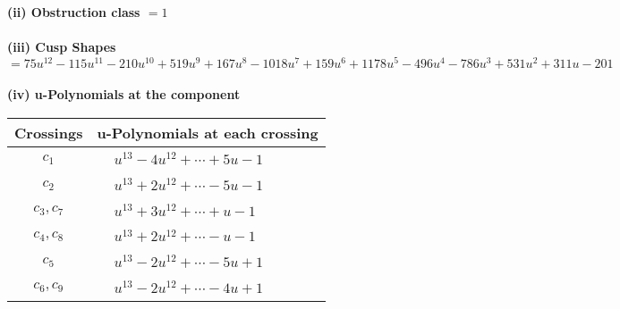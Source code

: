 \documentclass[1p]{elsarticle_modified}
\theoremstyle{definition}
\begin{document}
\flushleft \textbf{(ii) Obstruction class $= 1$}\\~\\
\flushleft \textbf{(iii) Cusp Shapes $= 75 u^{12}-115 u^{11}-210 u^{10}+519 u^9+167 u^8-1018 u^7+159 u^6+1178 u^5-496 u^4-786 u^3+531 u^2+311 u-201$}\\~\\
\newpage\renewcommand{\arraystretch}{1}
\flushleft \textbf{(iv) u-Polynomials at the component}\newline \\
\begin{tabular}{m{50pt}|m{274pt}}
Crossings & \hspace{64pt}u-Polynomials at each crossing \\
\hline $$\begin{aligned}c_{1}\end{aligned}$$&$\begin{aligned}
&u^{13}-4 u^{12}+\cdots+5 u-1
\end{aligned}$\\
\hline $$\begin{aligned}c_{2}\end{aligned}$$&$\begin{aligned}
&u^{13}+2 u^{12}+\cdots-5 u-1
\end{aligned}$\\
\hline $$\begin{aligned}c_{3},c_{7}\end{aligned}$$&$\begin{aligned}
&u^{13}+3 u^{12}+\cdots+u-1
\end{aligned}$\\
\hline $$\begin{aligned}c_{4},c_{8}\end{aligned}$$&$\begin{aligned}
&u^{13}+2 u^{12}+\cdots- u-1
\end{aligned}$\\
\hline $$\begin{aligned}c_{5}\end{aligned}$$&$\begin{aligned}
&u^{13}-2 u^{12}+\cdots-5 u+1
\end{aligned}$\\
\hline $$\begin{aligned}c_{6},c_{9}\end{aligned}$$&$\begin{aligned}
&u^{13}-2 u^{12}+\cdots-4 u+1
\end{aligned}$\\

\end{tabular}
\end{document}
